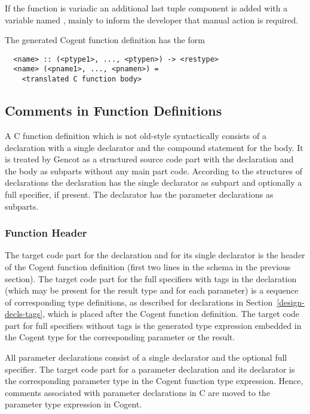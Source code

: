 If the function is variadic an additional last tuple component is added with a variable named
, mainly to inform the developer that manual action is required.

The generated Cogent function definition has the form
\begin{verbatim}
  <name> :: (<ptype1>, ..., <ptypen>) -> <restype>
  <name> (<pname1>, ..., <pnamen>) = 
    <translated C function body>
\end{verbatim}

\subsection{Comments in Function Definitions}
\label{design-fundefs-comments}

A C function definition which is not old-style syntactically consists of a declaration with a single declarator
and the compound statement for the body.
It is treated by Gencot as a structured source code part with the declaration and the body as subparts
without any main part code. According to the structures of declarations the declaration has the single declarator as subpart
and optionally a full specifier, if present. The declarator has the parameter declarations as subparts.

\subsubsection{Function Header}

The target code part for the declaration and for its single declarator is the header of the Cogent function definition
(first two lines in the schema in the previous section). The target code part for the full specifiers with tags in
the declaration (which may be present for the result type and for each parameter) is a sequence of corresponding 
type definitions, as described for declarations in Section~\ref{design-decls-tags}, which is placed 
after the Cogent function definition. The target code part for full specifiers without tags is the generated type
expression embedded in the Cogent type for the corresponding parameter or the result.

All parameter declarations consist of a single declarator and the optional full specifier. The target code part for
a parameter declaration and its declarator is the corresponding parameter type in the Cogent function type expression.
Hence, comments associated with parameter declarations in C are moved to the parameter type expression in Cogent.


